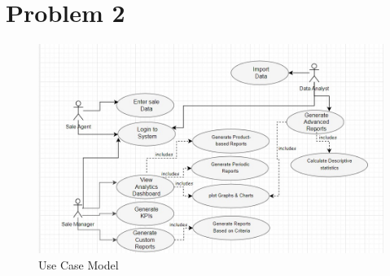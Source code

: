 \section {Problem 2}

\begin{figure}[!htb]
    \begin{center}
    \includegraphics[width=15cm]{images/use_case_diagram.jpeg} %
    \end{center}
    \caption{Use Case Model \label{Use Case Model}}
\end{figure}

